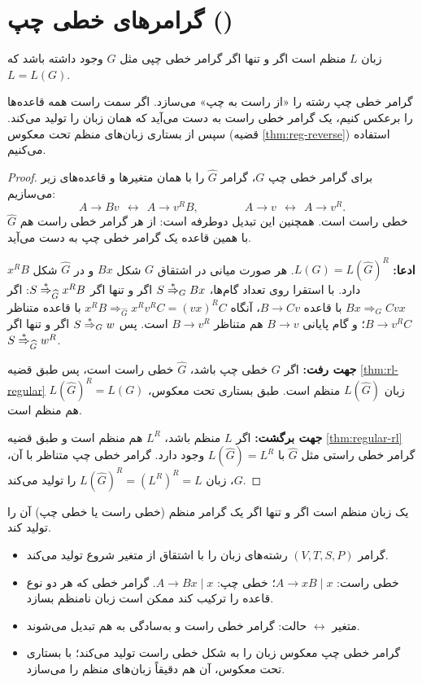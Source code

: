 \section{گرامرهای خطی چپ ()}

\begin{theorem}
زبان $L$ منظم است اگر و تنها اگر گرامر خطی چپی مثل $G$ وجود داشته باشد که $L=L(G)$.
\end{theorem}

\begin{proofidea}
گرامر خطی چپ رشته را «از راست به چپ» می‌سازد. اگر سمت راست همه قاعده‌ها را برعکس کنیم، یک گرامر خطی راست به دست می‌آید که  همان زبان را تولید می‌کند. سپس از بستاری زبان‌های منظم تحت معکوس (قضیه \ref{thm:reg-reverse}) استفاده می‌کنیم.
\end{proofidea}

\begin{proof}
برای گرامر خطی چپ $G$، گرامر $\widehat{G}$ را با همان متغیرها و قاعده‌های زیر می‌سازیم:
\[A\to Bv\ \ \leftrightarrow\ \ A\to v^RB,\qquad\qquad A\to v\ \ \leftrightarrow\ \ A\to v^R.\]
$\widehat{G}$ خطی راست است. همچنین این تبدیل دوطرفه است: از هر گرامر خطی راست هم با همین قاعده یک گرامر خطی چپ به دست می‌آید.

\textbf{ادعا:} $L(G)=L(\widehat{G})^R$. هر صورت میانی در اشتقاق $G$ شکل $Bx$ و در $\widehat{G}$ شکل $x^RB$ دارد. با استقرا روی تعداد گام‌ها، $S\overset{*}{\Rightarrow}_G Bx$ اگر و تنها اگر $S\overset{*}{\Rightarrow}_{\widehat G} x^RB$: اگر $Bx\Rightarrow_G Cvx$ با قاعده $B\to Cv$، آنگاه $x^RB\Rightarrow_{\widehat G}x^Rv^RC=(vx)^RC$ با قاعده متناظر $B\to v^RC$؛ و گام پایانی $B\to v$ هم متناظر $B\to v^R$ است. پس $S\overset{*}{\Rightarrow}_G w$ اگر و تنها اگر $S\overset{*}{\Rightarrow}_{\widehat G}w^R$.

\textbf{جهت رفت:} اگر $G$ خطی چپ باشد، $\widehat{G}$ خطی راست است، پس طبق قضیه \ref{thm:rl-regular} زبان $L(\widehat G)$ منظم است. طبق بستاری تحت معکوس، $L(\widehat G)^R=L(G)$ هم منظم است.

\textbf{جهت برگشت:} اگر $L$ منظم باشد، $L^R$ هم منظم است و طبق قضیه \ref{thm:regular-rl} گرامر خطی راستی مثل $\widehat G$ با $L(\widehat G)=L^R$ وجود دارد. گرامر خطی چپ متناظر با آن، $G$، زبان $L(\widehat G)^R=(L^R)^R=L$ را تولید می‌کند.
\end{proof}

\begin{corollary}
یک زبان منظم است اگر و تنها اگر یک گرامر منظم (خطی راست یا خطی چپ) آن را تولید کند.
\end{corollary}

\begin{summary}
\begin{itemize}
\item گرامر $(V,T,S,P)$ رشته‌های زبان را با اشتقاق از متغیر شروع تولید می‌کند.
\item خطی راست: $A\to xB\mid x$؛ خطی چپ: $A\to Bx\mid x$. گرامر خطی که هر دو نوع قاعده را ترکیب کند ممکن است زبان نامنظم بسازد.
\item متغیر $\leftrightarrow$ حالت: گرامر خطی راست و  به‌سادگی به هم تبدیل می‌شوند.
\item گرامر خطی چپ معکوس زبان را به شکل خطی راست تولید می‌کند؛ با بستاری تحت معکوس، آن هم دقیقاً زبان‌های منظم را می‌سازد.
\end{itemize}
\end{summary}
